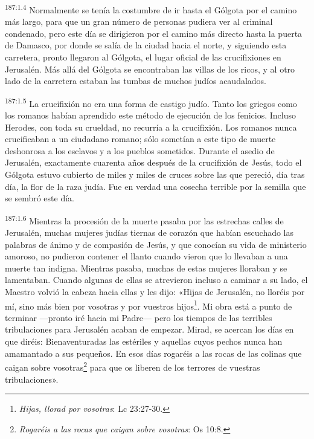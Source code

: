 \par 
\textsuperscript{187:1.4} Normalmente se tenía la costumbre de ir hasta el Gólgota por el camino más largo, para que un gran número de personas pudiera ver al criminal condenado, pero este día se dirigieron por el camino más directo hasta la puerta de Damasco, por donde se salía de la ciudad hacia el norte, y siguiendo esta carretera, pronto llegaron al Gólgota, el lugar oficial de las crucifixiones en Jerusalén. Más allá del Gólgota se encontraban las villas de los ricos, y al otro lado de la carretera estaban las tumbas de muchos judíos acaudalados.

\par 
\textsuperscript{187:1.5} La crucifixión no era una forma de castigo judío. Tanto los griegos como los romanos habían aprendido este método de ejecución de los fenicios. Incluso Herodes, con toda su crueldad, no recurría a la crucifixión. Los romanos nunca crucificaban a un ciudadano romano; sólo sometían a este tipo de muerte deshonrosa a los esclavos y a los pueblos sometidos. Durante el asedio de Jerusalén, exactamente cuarenta años después de la crucifixión de Jesús, todo el Gólgota estuvo cubierto de miles y miles de cruces sobre las que pereció, día tras día, la flor de la raza judía. Fue en verdad una cosecha terrible por la semilla que se sembró este día.

\par 
\textsuperscript{187:1.6} Mientras la procesión de la muerte pasaba por las estrechas calles de Jerusalén, muchas mujeres judías tiernas de corazón que habían escuchado las palabras de ánimo y de compasión de Jesús, y que conocían su vida de ministerio amoroso, no pudieron contener el llanto cuando vieron que lo llevaban a una muerte tan indigna. Mientras pasaba, muchas de estas mujeres lloraban y se lamentaban. Cuando algunas de ellas se atrevieron incluso a caminar a su lado, el Maestro volvió la cabeza hacia ellas y les dijo: «Hijas de Jerusalén, no lloréis por mí, sino más bien por vosotras y por vuestros hijos\footnote{\textit{Hijas, llorad por vosotras}: Lc 23:27-30.}. Mi obra está a punto de terminar ---pronto iré hacia mi Padre--- pero los tiempos de las terribles tribulaciones para Jerusalén acaban de empezar. Mirad, se acercan los días en que diréis: Bienaventuradas las estériles y aquellas cuyos pechos nunca han amamantado a sus pequeños. En esos días rogaréis a las rocas de las colinas que caigan sobre vosotras\footnote{\textit{Rogaréis a las rocas que caigan sobre vosotras}: Os 10:8.} para que os liberen de los terrores de vuestras tribulaciones».

